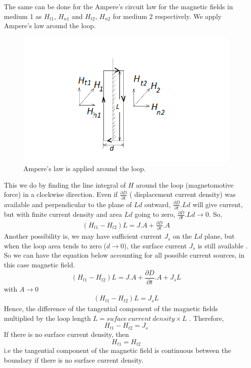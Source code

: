 The same can be done for the Ampere's circuit law for the magnetic fields in medium 1 as $H_{t1}$, $H_{n1}$ and $H_{t2}$, $H_{n2}$ for medium 2 respectively. We apply Ampere's law around the loop.
\begin{figure}[h]
\centering
\includegraphics[width=1\linewidth]{./graphics/diemedium4_2}
\caption{Ampere's law is applied around the loop.}
\end{figure}
This we do by finding the line integral of $H$ around the loop (magnetomotive force) in a clockwise direction. Even if $\frac{\partial\overline{D}}{\partial t}$ ( displacement current density) was available and perpendicular to the plane of $Ld$ outward, $\frac{\partial\overline{D}}{\partial t}. Ld$ will give current, but with finite current density and area $Ld$ going to zero,  $\frac{\partial\overline{D}}{\partial t}. Ld \rightarrow 0 $. So,
\begin{align*}
(H_{t1} - H_{t2})L = J.A +\frac{\partial D}{\partial t}.A
\end{align*}
Another possibility is, we may have sufficient current $J_s$ on the $Ld$ plane, but when the loop area tends to zero ($d \rightarrow 0 $), the surface current $J_s$ is still available . So we can have the equation below accounting for all possible current sources, in this case magnetic field.
\begin{equation}
(H_{t1} - H_{t2})L = J.A +\frac{\partial D}{\partial t}.A + J_sL
\end{equation}
with $A \rightarrow 0$
\begin{align*}
(H_{t1} - H_{t2})L = J_sL
\end{align*}
Hence, the difference of the tangential component of the magnetic fields multiplied by the loop length $L = suface\ current\ density \times L$ . Therefore,
\begin{equation}
H_{t1} - H_{t2} = J_s
\end{equation}
If there is no surface current density, then 
\begin{equation}
H_{t1} = H_{t2}
\end{equation}
i.e the tangential component of the magnetic field is continuous between the boundary if there is no surface current density.

